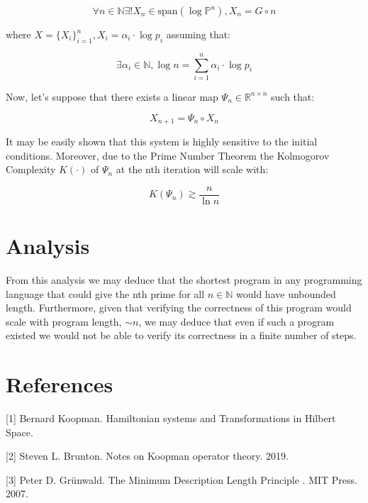 \documentclass{article}
\begin{document}
\begin{equation}
\forall n \in \mathbb{N} \exists! X_n \in \text{span}(\log \mathbb{P}^n), X_n = G \circ n
\end{equation}

where $X = \{X_i\}_{i=1}^n, X_i = \alpha_i \cdot \log p_i$ assuming that:

\begin{equation}
\exists \alpha_i \in \mathbb{N}, \log n = \sum_{i=1}^n \alpha_i \cdot \log p_i
\end{equation}

Now, let's suppose that there exists a linear map $\Psi_n \in \mathbb{R}^{n \times n}$ such that:

\begin{equation}
X_{n+1} = \Psi_n \circ X_n
\end{equation}

It may be easily shown that this system is highly sensitive to the initial conditions. Moreover, due to the Prime Number Theorem the Kolmogorov Complexity $K(\cdot)$ of $\Psi_n$ at the nth iteration will scale with:

\begin{equation}
K(\Psi_n) \gtrsim \frac{n}{\ln n}
\end{equation}

\newpage

\section{Analysis}

From this analysis we may deduce that the shortest program in any programming language that could give the nth prime for all $n \in \mathbb{N}$ would have unbounded length. Furthermore, given that verifying the correctness of this program would scale with program length, $ \sim n$, we may deduce that even if such a program existed we would not be able to verify its correctness in a finite number of steps. 

\section*{References}

\small

[1] Bernard Koopman. Hamiltonian systems and Transformations in Hilbert Space.

[2] Steven L. Brunton. Notes on Koopman operator theory. 2019.

[3] Peter D. Grünwald. The Minimum Description Length Principle
. MIT Press. 2007.
\end{document}
